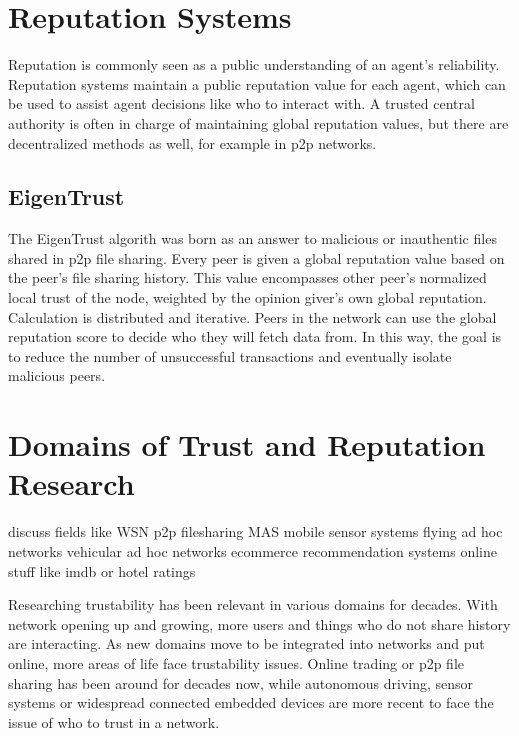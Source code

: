 \documentclass[%
    ]{\PathToTumTemplate/thesis/tum_thesis}
\begin{document}
\section{Reputation Systems}
Reputation is commonly seen as a public understanding of an agent's reliability.
Reputation systems maintain a public reputation value for each agent, which can be used to assist agent decisions like who to interact with.
A trusted central authority is often in charge of maintaining global reputation values, but there are decentralized methods as well, for example in \gls{p2p} networks\cite{kamvar_eigentrust_2003,kurdi_honestpeer_2015,keshavarz_uastrustchain_2020}.

\subsection{EigenTrust}
The EigenTrust algorith \cite{kamvar_eigentrust_2003} was born as an answer to malicious or inauthentic files shared in \gls{p2p} file sharing. Every peer is given a global reputation value based on the peer's file sharing history. This value encompasses other peer's normalized local trust of the node, weighted by the opinion giver's own global reputation. Calculation is distributed and iterative. Peers in the network can use the global reputation score to decide who they will fetch data from. In this way, the goal is to reduce the number of unsuccessful transactions and eventually isolate malicious peers.


\section{Domains of Trust and Reputation Research}

discuss fields like 
WSN
\gls{p2p} filesharing
MAS
mobile sensor systems
flying ad hoc networks
vehicular ad hoc networks
ecommerce
recommendation systems online stuff like imdb or hotel ratings

Researching trustability has been relevant in various domains for decades. With network opening up and growing, more users and things who do not share history are interacting. As new domains move to be integrated into networks and put online, more areas of life face trustability issues. Online trading or \gls{p2p} file sharing has been around for decades now, while autonomous driving, sensor systems or widespread connected embedded devices are more recent to face the issue of who to trust in a network.
\end{document}
